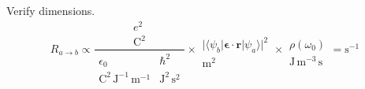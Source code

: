 Verify dimensions.
\begin{equation*}
R_{a\rightarrow b}\propto
\frac{\begin{matrix}
e^2
\\
\text{C}^2
\end{matrix}}
{\begin{matrix}
\epsilon_0 & \hbar^2
\\
\text{C}^2\,\text{J}^{-1}\,\text{m}^{-1} & \text{J}^2\,\text{s}^2
\end{matrix}}
\times
\begin{matrix}
\\
\bigl|\langle\psi_b|\boldsymbol{\epsilon}\cdot\mathbf r|\psi_a\rangle\bigr|^2
\\
\text{m}^2
\end{matrix}
\times
\begin{matrix}
\\
\rho(\omega_0)
\\
\text{J}\,\text{m}^{-3}\,\text{s}
\end{matrix}
=\text{s}^{-1}
\end{equation*}


